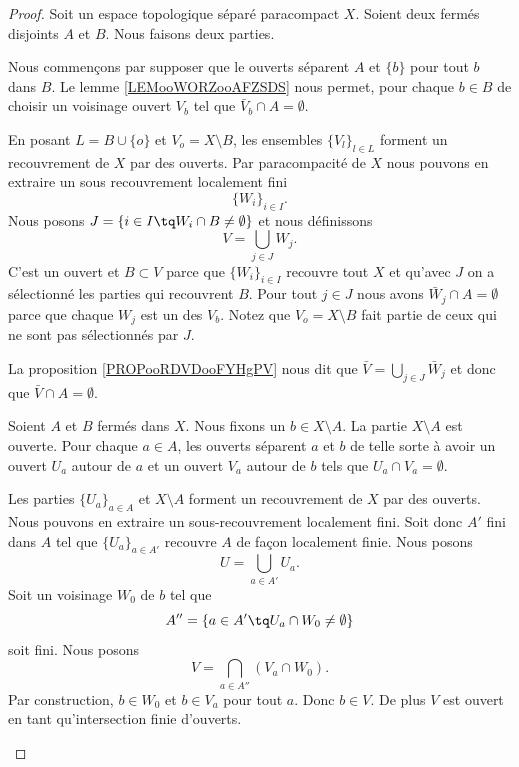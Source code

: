 \begin{proof}
	Soit un espace topologique séparé paracompact \( X\). Soient deux fermés disjoints \( A\) et \( B\). Nous faisons deux parties.
	\begin{subproof}
		Nous commençons par supposer que le ouverts séparent \( A\) et \( \{ b \}\) pour tout \( b\) dans \( B\). Le lemme \ref{LEMooWORZooAFZSDS} nous permet, pour chaque \( b\in B\) de choisir un voisinage ouvert \( V_b\) tel que \( \bar V_b\cap A=\emptyset\).

		En posant \( L=B\cup\{ o \}\) et \( V_o=X\setminus B\), les ensembles \( \{ V_l \}_{l\in L}\) forment un recouvrement de \( X\) par des ouverts. Par paracompacité de \( X\) nous pouvons en extraire un sous recouvrement localement fini
		\begin{equation}
			\{ W_i \}_{i\in I}.
		\end{equation}
		Nous posons \( J=\{ i\in I\tq W_i\cap B\neq\emptyset \}\) et nous définissons
		\begin{equation}
			V=\bigcup_{j\in J}W_j.
		\end{equation}
		C'est un ouvert et \( B\subset V\) parce que \( \{ W_i \}_{i\in I}\) recouvre tout \( X\) et qu'avec \( J\) on a sélectionné les parties qui recouvrent \( B\). Pour tout \( j\in J\) nous avons \( \bar W_j\cap A=\emptyset \) parce que chaque \( W_j\) est un des \( V_b\). Notez que \( V_o=X\setminus B\) fait partie de ceux qui ne sont pas sélectionnés par \( J\).

		La proposition \ref{PROPooRDVDooFYHgPV} nous dit que \( \bar V=\bigcup_{j\in J}\bar W_j\) et donc que \( \bar V\cap A=\emptyset\).

		Soient \( A\) et \( B\) fermés dans \( X\). Nous fixons un \( b\in X\setminus A\). La partie \( X\setminus A\) est ouverte. Pour chaque \( a\in A\), les ouverts séparent \( a\) et \( b\) de telle sorte à avoir un ouvert \( U_a\) autour de \( a\) et un ouvert \( V_a\) autour de \( b\) tels que \( U_a\cap V_a=\emptyset\).

		Les parties \( \{ U_a \}_{a\in A}\) et \( X\setminus A\) forment un recouvrement de \( X\) par des ouverts. Nous pouvons en extraire un sous-recouvrement localement fini. Soit donc \( A'\) fini dans \( A\) tel que \( \{ U_a \}_{a\in A'}\) recouvre \( A\) de façon localement finie. Nous posons
		\begin{equation}
			U=\bigcup_{a\in A'}U_a.
		\end{equation}
		Soit un voisinage \( W_0\) de \( b\) tel que
		\begin{equation}
			A''=\{ a\in A'\tq U_a\cap W_0\neq \emptyset \}
		\end{equation}
		soit fini. Nous posons
		\begin{equation}
			V=\bigcap_{a\in A''}(V_a\cap W_0).
		\end{equation}
		Par construction, \( b\in W_0\)  et \( b\in V_a\) pour tout \( a\). Donc \( b\in V\). De plus \( V\) est ouvert en tant qu'intersection finie d'ouverts.


\end{subproof}
\end{proof}
